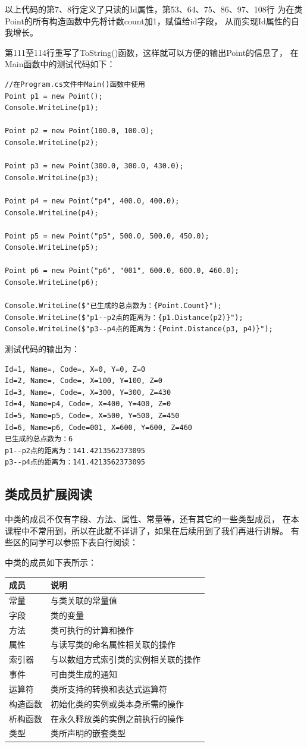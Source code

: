 以上代码的第7、8行定义了只读的Id属性，第53、64、75、86、97、108行
为在类Point的所有构造函数中先将计数count加1，赋值给id字段，
从而实现Id属性的自我增长。

第111至114行重写了ToString()函数，这样就可以方便的输出Point的信息了，
在Main函数中的测试代码如下：

\begin{lstlisting}
//在Program.cs文件中Main()函数中使用
Point p1 = new Point();
Console.WriteLine(p1);

Point p2 = new Point(100.0, 100.0);
Console.WriteLine(p2);

Point p3 = new Point(300.0, 300.0, 430.0);
Console.WriteLine(p3);

Point p4 = new Point("p4", 400.0, 400.0);
Console.WriteLine(p4);

Point p5 = new Point("p5", 500.0, 500.0, 450.0);
Console.WriteLine(p5);

Point p6 = new Point("p6", "001", 600.0, 600.0, 460.0);
Console.WriteLine(p6);

Console.WriteLine($"已生成的总点数为：{Point.Count}"); 
Console.WriteLine($"p1--p2点的距离为：{p1.Distance(p2)}"); 
Console.WriteLine($"p3--p4点的距离为：{Point.Distance(p3, p4)}"); 
\end{lstlisting}

测试代码的输出为：
\begin{verbatim}
Id=1, Name=, Code=, X=0, Y=0, Z=0
Id=2, Name=, Code=, X=100, Y=100, Z=0
Id=3, Name=, Code=, X=300, Y=300, Z=430
Id=4, Name=p4, Code=, X=400, Y=400, Z=0
Id=5, Name=p5, Code=, X=500, Y=500, Z=450
Id=6, Name=p6, Code=001, X=600, Y=600, Z=460
已生成的总点数为：6
p1--p2点的距离为：141.4213562373095
p3--p4点的距离为：141.4213562373095
\end{verbatim}


\subsection{类成员扩展阅读}
\cs 中类的成员不仅有字段、方法、属性、常量等，还有其它的一些类型成员，
在本课程中不常用到，所以在此就不详讲了，如果在后续用到了我们再进行讲解。
有些区的同学可以参照下表自行阅读：

\cs 中类的成员如下表所示：
\begin{tabular}{|l|l|}
\hline
成员     &  说明   \\
\hline
常量     &         与类关联的常量值 \\
字段     &         类的变量 \\
方法     &         类可执行的计算和操作 \\
属性     &         与读写类的命名属性相关联的操作 \\
索引器   &      与以数组方式索引类的实例相关联的操作 \\
事件     &         可由类生成的通知 \\
运算符   &      类所支持的转换和表达式运算符 \\
构造函数 &   初始化类的实例或类本身所需的操作 \\
析构函数 &   在永久释放类的实例之前执行的操作 \\
类型     &         类所声明的嵌套类型 \\
\hline
\end{tabular}

